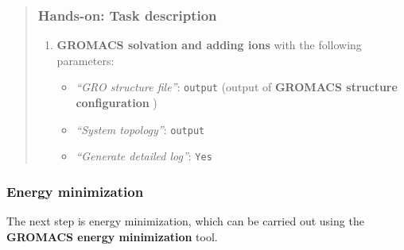\documentclass[twocolumn]{bmcart}%
\providecommand{\tightlist}{%
  \setlength{\itemsep}{0pt}\setlength{\parskip}{0pt}}
\providecommand{\tightlist}{%
  \setlength{\itemsep}{0pt}\setlength{\parskip}{0pt}}
\begin{document}
\begin{quote}
\subsubsection{Hands-on: Task
description}\label{hands-on-task-description-4}

\begin{enumerate}
\def\labelenumi{\arabic{enumi}.}
\tightlist
\item
  \textbf{GROMACS solvation and adding ions} with the following
  parameters:

  \begin{itemize}
  \tightlist
  \item
    \emph{``GRO structure file''}: \texttt{output} (output of
    \textbf{GROMACS structure configuration} )
  \item
    \emph{``System topology''}: \texttt{output}
  \item
    \emph{``Generate detailed log''}: \texttt{Yes}
  \end{itemize}
\end{enumerate}

\end{quote}

\subsubsection{Energy minimization}\label{energy-minimization}

The next step is energy minimization, which can be carried out using the
\textbf{GROMACS energy minimization} tool.
\end{document}
